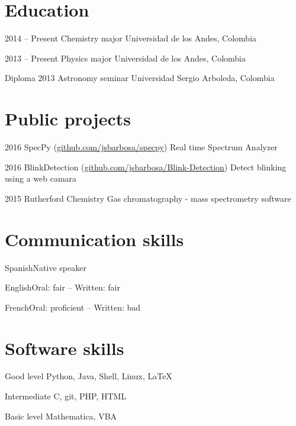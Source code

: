 \documentclass{tccv}
\begin{document}
\section{Education}

\begin{yearlist}

\item{2014 -- Present}
     {Chemistry major}
     {Universidad de los Andes, Colombia}
     
\item{2013 -- Present}
     {Physics major}
     {Universidad de los Andes, Colombia}
     
\item[Diploma]{2013}
     {Astronomy seminar}
     {Universidad Sergio Arboleda, Colombia}

\end{yearlist}

\section{Public projects}

\begin{yearlist}

\item{2016}
     {SpecPy (\href{http://github.com/jsbarbosa/specpy}{github.com/jsbarbosa/specpy})}
     {Real time Spectrum Analyzer}

\item{2016}
     {BlinkDetection (\href{http://tip.entidi.com/}{github.com/jsbarbosa/Blink-Detection})}
     {Detect blinking using a web camara}

\item{2015}
     {Rutherford Chemistry}
     {Gas chromatography - mass spectrometry software}

\end{yearlist}

\section{Communication skills}

\begin{factlist}
\item{Spanish}{Native speaker}
\item{English}{Oral: fair -- Written: fair}
\item{French}{Oral: proficient -- Written: bad}

\end{factlist}

\section{Software skills}

\begin{factlist}

\item{Good level}
     {Python, Java, Shell, Linux, \LaTeX}

\item{Intermediate}
     {C, git, PHP, HTML}

\item{Basic level}
     {Mathematica, VBA}

\end{factlist}
\end{document}
